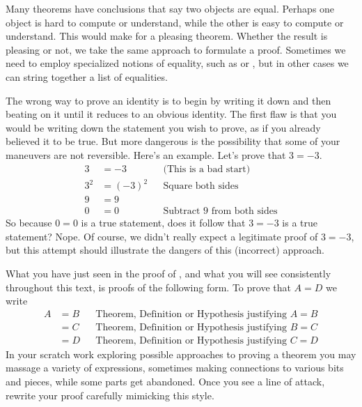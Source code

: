 Many theorems have conclusions that say two objects are equal.  Perhaps one object is hard to compute or understand, while the other is easy to compute or understand.  This would make for a pleasing theorem.  Whether the result is pleasing or not, we take the same approach to formulate a proof.  Sometimes we need to employ specialized notions of equality, such as  or , but in other cases we can string together a list of equalities.\par
%
The wrong way to prove an identity is to begin by writing it down and then beating on it until it reduces to an obvious identity.  The first flaw is that you would be writing down the statement you wish to prove, as if you already believed it to be true.  But more dangerous is the possibility that some of your maneuvers are not reversible.  Here's an example.  Let's prove that $3=-3$.
%
\begin{align*}
3&=-3&&\text{(This is a bad start)}\\
3^2&=(-3)^2&&\text{Square both sides}\\
9&=9\\
0&=0&&\text{Subtract 9 from both sides}
\end{align*}
%
So because $0=0$ is a true statement, does it follow that $3=-3$ is a true statement?  Nope.  Of course, we didn't really expect a legitimate proof of $3=-3$, but this attempt should illustrate the dangers of this (incorrect) approach.\par
%
What you have just seen in the proof of , and what you will see consistently throughout this text, is proofs of the following form.  To prove that $A=D$ we write
%
\begin{align*}
A
&=B&&\text{Theorem, Definition or Hypothesis justifying $A=B$}\\
&=C&&\text{Theorem, Definition or Hypothesis justifying $B=C$}\\
&=D&&\text{Theorem, Definition or Hypothesis justifying $C=D$}
\end{align*}
%
In your scratch work exploring possible approaches to proving a theorem you may massage a variety of expressions, sometimes making connections to various bits and pieces, while some parts get abandoned.  Once you see a line of attack, rewrite your proof carefully mimicking this style.
